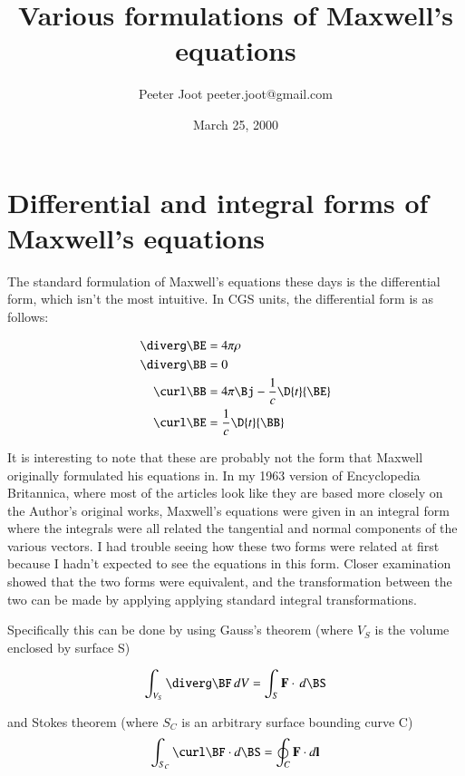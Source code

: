 \documentclass{article}      %
\title{Various formulations of Maxwell's equations} %
\author{Peeter Joot \quad peeter.joot@gmail.com}         %
\date{March 25, 2000}        %
\begin{document}


\section{Differential and integral forms of Maxwell's equations}

The standard formulation of Maxwell's equations these days is the differential
form, which isn't the most intuitive.  In CGS units, the differential
form is as follows:

\begin{align*}
\diverg \BE &= 4\pi\rho \\
\diverg \BB &= 0 \\
\curl \BB &= 4\pi \Bj - \frac{1}{c} \D{t}{\BE} \\
\curl \BE &= \frac{1}{c} \D{t}{\BB}
\end{align*}

It is interesting to note that these are probably not the form that Maxwell 
originally formulated his equations in.  In my 1963 version of Encyclopedia 
Britannica, where most of the articles look like they are based more closely on the Author's
original works, Maxwell's equations were given in an integral form where the 
integrals were all related the tangential and normal components of the various vectors.  I had 
trouble seeing how these two forms were related at first because I hadn't expected to 
see the equations in this form.  Closer examination showed that the two forms 
were equivalent, and the transformation between the two can be made by applying 
applying standard integral transformations.

Specifically this can be done by using Gauss's theorem (where $V_S$ is the volume enclosed by surface S)

\begin{equation*}
\int_{V_S} \diverg \BF\,dV =
\int_S \mathbf{F} \cdot\, d\BS 
\end{equation*}

and Stokes theorem (where $S_C$ is an arbitrary surface bounding curve C)
\begin{equation*}
\int_{S_C} \curl \BF \cdot d\BS = \oint_C \mathbf{F} \cdot d\mathbf{l}
\end{equation*}
\end{document}
